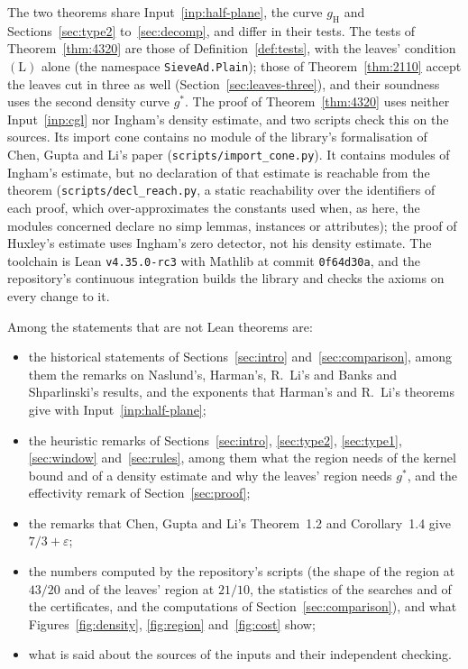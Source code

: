 \documentclass[11pt]{article}
\theoremstyle{definition}
\newcommand{\lean}[1]{\texttt{#1}}
\newcommand{\file}[1]{\nolinkurl{#1}}
\begin{document}
The two theorems share Input~\ref{inp:half-plane}, the curve $g_{\mathrm H}$ and Sections~\ref{sec:type2}
to~\ref{sec:decomp}, and differ in their tests. The tests of
Theorem~\ref{thm:4320} are those of Definition~\ref{def:tests}, with the leaves' condition $(\mathrm L)$ alone
(the namespace \lean{SieveAd.Plain}); those of Theorem~\ref{thm:2110} accept the leaves cut in three as well
(Section~\ref{sec:leaves-three}), and their soundness uses the second density curve $g^*$. The proof of
Theorem~\ref{thm:4320} uses neither Input~\ref{inp:cgl} nor Ingham's density estimate, and two scripts check this on
the sources. Its import cone contains no module of the library's formalisation of Chen, Gupta and Li's paper
(\file{scripts/import\_cone.py}). It contains modules of Ingham's estimate, but no declaration of that estimate is
reachable from the theorem (\file{scripts/decl\_reach.py}, a static reachability over the identifiers of each proof,
which over-approximates the constants used when, as here, the modules concerned declare no simp lemmas, instances or
attributes); the proof of Huxley's estimate uses Ingham's zero detector, not his density estimate. The
toolchain is Lean \texttt{v4.35.0-rc3} with Mathlib at commit \texttt{0f64d30a}, and the repository's continuous
integration builds the library and checks the axioms on every change to it.

Among the statements that are not Lean theorems are:
\begin{itemize}
\item the historical statements of Sections~\ref{sec:intro} and~\ref{sec:comparison}, among them the remarks on
  Naslund's, Harman's, R.~Li's and Banks and Shparlinski's results, and the exponents that Harman's and R.~Li's
  theorems give with Input~\ref{inp:half-plane};
\item the heuristic remarks of Sections~\ref{sec:intro}, \ref{sec:type2}, \ref{sec:type1}, \ref{sec:window}
  and~\ref{sec:rules}, among them what the region needs of the kernel bound and of a density estimate and why the
  leaves' region needs $g^*$, and the effectivity remark of Section~\ref{sec:proof};
\item the remarks that Chen, Gupta and Li's Theorem~1.2 and Corollary~1.4 give $7/3 + \varepsilon$;
\item the numbers computed by the repository's scripts (the shape of the region at $43/20$ and of the leaves' region
  at $21/10$, the statistics of the searches and of the certificates, and the computations of
  Section~\ref{sec:comparison}), and what Figures~\ref{fig:density}, \ref{fig:region} and~\ref{fig:cost} show;
\item what is said about the sources of the inputs and their independent checking.
\end{itemize}
\end{document}
